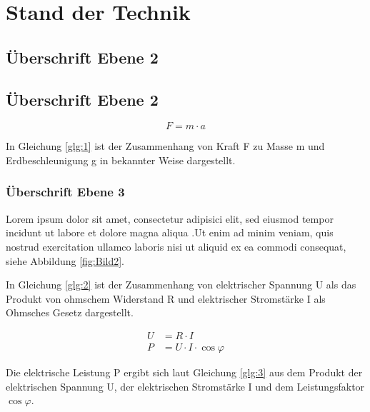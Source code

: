 \section{Stand der Technik}

\lipsum[1][1-5]

\subsection{Überschrift Ebene 2}

\lipsum[1][1-7] \cite{web:webseite1}

\subsection{Überschrift Ebene 2}

\lipsum[1][1-3]

\begin{equation} \label{glg:1}
    F=m \cdot a
\end{equation}

In Gleichung \ref{glg:1}  ist der Zusammenhang von Kraft F zu Masse m und Erdbeschleunigung
g in bekannter Weise dargestellt.

\subsubsection{Überschrift Ebene 3}

Lorem ipsum dolor sit amet, consectetur adipisici elit, sed eiusmod tempor incidunt ut labore
et dolore magna aliqua \cite{publikation:publikationtitel2}.Ut enim ad minim veniam, quis nostrud exercitation ullamco
laboris nisi ut aliquid ex ea commodi consequat, siehe Abbildung \ref{fig:Bild2}.

In Gleichung \ref{glg:2} ist der Zusammenhang von elektrischer Spannung U als das Produkt von
ohmschem Widerstand R und elektrischer Stromstärke I als Ohmsches Gesetz dargestellt.

\begin{align}
    U & = R \cdot I \label{glg:2}                    \\
    P & = U \cdot I \cdot \cos \varphi \label{glg:3}
\end{align}

Die elektrische Leistung P ergibt sich laut Gleichung \ref{glg:3} aus dem Produkt der elektrischen
Spannung U, der elektrischen Stromstärke I und dem Leistungsfaktor \(\cos \varphi\).

